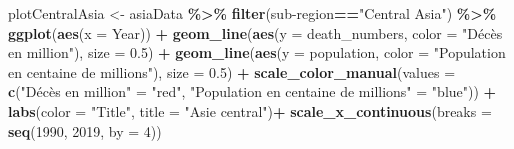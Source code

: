 \documentclass[
]{article}
\newenvironment{Shaded}{\begin{snugshade}}{\end{snugshade}}
\newcommand{\AttributeTok}[1]{\textcolor[rgb]{0.13,0.29,0.53}{#1}}
\newcommand{\DecValTok}[1]{\textcolor[rgb]{0.00,0.00,0.81}{#1}}
\newcommand{\FloatTok}[1]{\textcolor[rgb]{0.00,0.00,0.81}{#1}}
\newcommand{\FunctionTok}[1]{\textcolor[rgb]{0.13,0.29,0.53}{\textbf{#1}}}
\newcommand{\NormalTok}[1]{#1}
\newcommand{\OtherTok}[1]{\textcolor[rgb]{0.56,0.35,0.01}{#1}}
\newcommand{\SpecialCharTok}[1]{\textcolor[rgb]{0.81,0.36,0.00}{\textbf{#1}}}
\newcommand{\StringTok}[1]{\textcolor[rgb]{0.31,0.60,0.02}{#1}}
\begin{document}
\begin{Shaded}
\begin{Highlighting}[]
\NormalTok{plotCentralAsia }\OtherTok{\textless{}{-}}\NormalTok{ asiaData }\SpecialCharTok{\%\textgreater{}\%}
  \FunctionTok{filter}\NormalTok{(}\StringTok{\textasciigrave{}}\AttributeTok{sub{-}region}\StringTok{\textasciigrave{}}\SpecialCharTok{==}\StringTok{"Central Asia"}\NormalTok{) }\SpecialCharTok{\%\textgreater{}\%}
  \FunctionTok{ggplot}\NormalTok{(}\FunctionTok{aes}\NormalTok{(}\AttributeTok{x =}\NormalTok{ Year)) }\SpecialCharTok{+} 
  \FunctionTok{geom\_line}\NormalTok{(}\FunctionTok{aes}\NormalTok{(}\AttributeTok{y =}\NormalTok{ death\_numbers, }\AttributeTok{color =} \StringTok{"Décès en million"}\NormalTok{), }\AttributeTok{size =} \FloatTok{0.5}\NormalTok{) }\SpecialCharTok{+}
  \FunctionTok{geom\_line}\NormalTok{(}\FunctionTok{aes}\NormalTok{(}\AttributeTok{y =}\NormalTok{ population, }\AttributeTok{color =} \StringTok{"Population en centaine de millions"}\NormalTok{), }\AttributeTok{size =} \FloatTok{0.5}\NormalTok{) }\SpecialCharTok{+}
  \FunctionTok{scale\_color\_manual}\NormalTok{(}\AttributeTok{values =} \FunctionTok{c}\NormalTok{(}\StringTok{"Décès en million"} \OtherTok{=} \StringTok{"red"}\NormalTok{, }\StringTok{"Population en centaine de millions"} \OtherTok{=} \StringTok{"blue"}\NormalTok{)) }\SpecialCharTok{+}
  \FunctionTok{labs}\NormalTok{(}\AttributeTok{color =} \StringTok{"Title"}\NormalTok{, }\AttributeTok{title =} \StringTok{"Asie central"}\NormalTok{)}\SpecialCharTok{+}
  \FunctionTok{scale\_x\_continuous}\NormalTok{(}\AttributeTok{breaks =} \FunctionTok{seq}\NormalTok{(}\DecValTok{1990}\NormalTok{, }\DecValTok{2019}\NormalTok{, }\AttributeTok{by =} \DecValTok{4}\NormalTok{))}


\end{Highlighting}
\end{Shaded}
\end{document}
